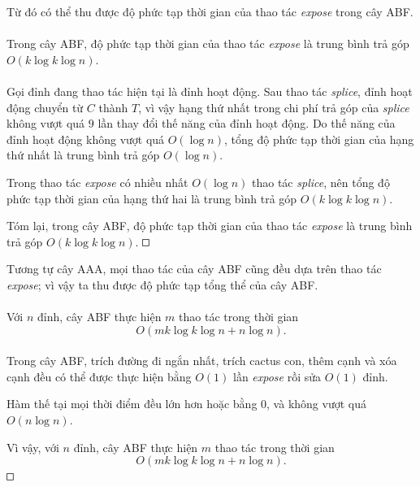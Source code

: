 \documentclass[11pt]{article}
\newcommand{\square}{\mathord{\vcenter{\hrule height .5pt
  \hbox{\vrule width .5pt height 5pt\kern5pt\vrule width .5pt}
  \hrule height .5pt}}}
\begin{document}
Từ đó có thể thu được độ phức tạp thời gian của thao tác \emph{expose} trong
cây ABF.

\paragraph{}
Trong cây ABF, độ phức tạp thời gian của thao tác \emph{expose} là trung
bình trả góp \(O(k\log k\log n)\).

\paragraph{}
Gọi đỉnh đang thao tác hiện tại là đỉnh hoạt động. Sau thao tác
\emph{splice}, đỉnh hoạt động chuyển từ \(C\) thành \(T\), vì vậy hạng thứ
nhất trong chi phí trả góp của \emph{splice} không vượt quá \(9\) lần thay
đổi thế năng của đỉnh hoạt động. Do thế năng của đỉnh hoạt động không vượt
quá \(O(\log n)\), tổng độ phức tạp thời gian của hạng thứ nhất là trung bình
trả góp \(O(\log n)\).

Trong thao tác \emph{expose} có nhiều nhất \(O(\log n)\) thao tác
\emph{splice}, nên tổng độ phức tạp thời gian của hạng thứ hai là trung bình
trả góp \(O(k\log k\log n)\).

Tóm lại, trong cây ABF, độ phức tạp thời gian của thao tác \emph{expose} là
trung bình trả góp \(O(k\log k\log n)\). \(\square\)

Tương tự cây AAA, mọi thao tác của cây ABF cũng đều dựa trên thao tác
\emph{expose}; vì vậy ta thu được độ phức tạp tổng thể của cây ABF.

\paragraph{}
Với \(n\) đỉnh, cây ABF thực hiện \(m\) thao tác trong thời gian
\[
  O(mk\log k\log n+n\log n).
\]

\paragraph{}
Trong cây ABF, trích đường đi ngắn nhất, trích cactus con, thêm cạnh và xóa
cạnh đều có thể được thực hiện bằng \(O(1)\) lần \emph{expose} rồi sửa
\(O(1)\) đỉnh.

Hàm thế tại mọi thời điểm đều lớn hơn hoặc bằng \(0\), và không vượt quá
\(O(n\log n)\).

Vì vậy, với \(n\) đỉnh, cây ABF thực hiện \(m\) thao tác trong thời gian
\[
  O(mk\log k\log n+n\log n).
\]
\(\square\)
\end{document}
